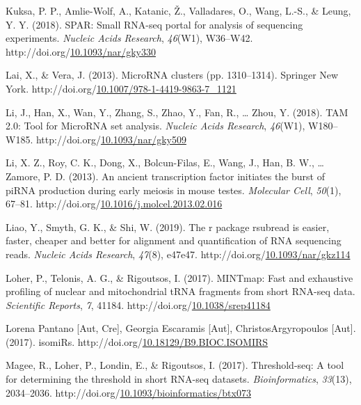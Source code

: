 \documentclass[12pt,twoside]{reedthesis}
\newlength{\cslhangindent}
\newenvironment{CSLReferences}[2] %
 {%
  \setlength{\parindent}{0pt}
  \ifodd #1 \everypar{\setlength{\hangindent}{\cslhangindent}}\ignorespaces\fi
  \ifnum #2 > 0
  \setlength{\parskip}{#2\baselineskip}
  \fi
 }%
 {}
\begin{document}
\begin{CSLReferences}{1}{0}
\leavevmode{}%
Kuksa, P. P., Amlie-Wolf, A., Katanic, Ž., Valladares, O., Wang, L.-S., \& Leung, Y. Y. (2018). SPAR: Small RNA-seq portal for analysis of sequencing experiments. \emph{Nucleic Acids Research}, \emph{46}(W1), W36--W42. http://doi.org/\href{https://doi.org/10.1093/nar/gky330}{10.1093/nar/gky330}

\leavevmode{}%
Lai, X., \& Vera, J. (2013). MicroRNA clusters (pp. 1310--1314). Springer New York. http://doi.org/\href{https://doi.org/10.1007/978-1-4419-9863-7_1121}{10.1007/978-1-4419-9863-7\_1121}

\leavevmode{}%
Li, J., Han, X., Wan, Y., Zhang, S., Zhao, Y., Fan, R., \ldots{} Zhou, Y. (2018). TAM 2.0: Tool for MicroRNA set analysis. \emph{Nucleic Acids Research}, \emph{46}(W1), W180--W185. http://doi.org/\href{https://doi.org/10.1093/nar/gky509}{10.1093/nar/gky509}

\leavevmode{}%
Li, X. Z., Roy, C. K., Dong, X., Bolcun-Filas, E., Wang, J., Han, B. W., \ldots{} Zamore, P. D. (2013). An ancient transcription factor initiates the burst of piRNA production during early meiosis in mouse testes. \emph{Molecular Cell}, \emph{50}(1), 67--81. http://doi.org/\href{https://doi.org/10.1016/j.molcel.2013.02.016}{10.1016/j.molcel.2013.02.016}

\leavevmode{}%
Liao, Y., Smyth, G. K., \& Shi, W. (2019). The r package rsubread is easier, faster, cheaper and better for alignment and quantification of RNA sequencing reads. \emph{Nucleic Acids Research}, \emph{47}(8), e47e47. http://doi.org/\href{https://doi.org/10.1093/nar/gkz114}{10.1093/nar/gkz114}

\leavevmode{}%
Loher, P., Telonis, A. G., \& Rigoutsos, I. (2017). MINTmap: Fast and exhaustive profiling of nuclear and mitochondrial tRNA fragments from short RNA-seq data. \emph{Scientific Reports}, \emph{7}, 41184. http://doi.org/\href{https://doi.org/10.1038/srep41184}{10.1038/srep41184}

\leavevmode{}%
Lorena Pantano {[}Aut, Cre{]}, Georgia Escaramis {[}Aut{]}, ChristosArgyropoulos {[}Aut{]}. (2017). isomiRs. http://doi.org/\href{https://doi.org/10.18129/B9.BIOC.ISOMIRS}{10.18129/B9.BIOC.ISOMIRS}

\leavevmode{}%
Magee, R., Loher, P., Londin, E., \& Rigoutsos, I. (2017). Threshold-seq: A tool for determining the threshold in short RNA-seq datasets. \emph{Bioinformatics}, \emph{33}(13), 2034--2036. http://doi.org/\href{https://doi.org/10.1093/bioinformatics/btx073}{10.1093/bioinformatics/btx073}


\end{CSLReferences}
\end{document}
